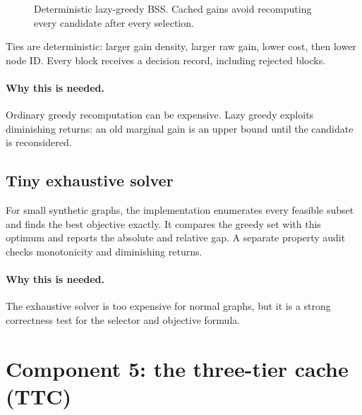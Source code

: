 \documentclass[11pt]{article}
\newcommand{\why}{\paragraph{Why this is needed.}}
\begin{document}
\begin{figure}[htbp]
\centering
{}
\caption{Deterministic lazy-greedy BSS. Cached gains avoid recomputing every candidate after every
selection.}
\label{fig:lazy-greedy}
\end{figure}

Ties are deterministic: larger gain density, larger raw gain, lower cost, then lower node ID.
Every block receives a decision record, including rejected blocks.

\why Ordinary greedy recomputation can be expensive. Lazy greedy exploits diminishing returns:
an old marginal gain is an upper bound until the candidate is reconsidered.

\subsection{Tiny exhaustive solver}

For small synthetic graphs, the implementation enumerates every feasible subset and finds the
best objective exactly. It compares the greedy set with this optimum and reports the absolute and
relative gap. A separate property audit checks monotonicity and diminishing returns.

\why The exhaustive solver is too expensive for normal graphs, but it is a strong correctness
test for the selector and objective formula.

\section{Component 5: the three-tier cache (TTC)}
\label{sec:tiers}
\end{document}
